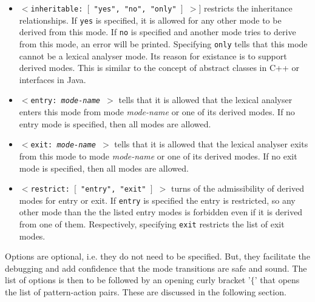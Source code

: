 \begin{itemize}
\item {\tt $<$inheritable: $[$ "yes", "no", "only" $]$ $>$$]$} restricts the
  inheritance relationships. If {\tt yes} is specified, it is allowed for any
  other mode to be derived from this mode. If {\tt no} is specified and
  another mode tries to derive from this mode, an error will be printed.
  Specifying {\tt only} tells that this mode cannot be a lexical analyser mode.
  Its reason for existance is to support derived modes. This is similar to the
  concept of abstract classes in C++ or interfaces in Java.
  
\item {\tt $<$entry: {\it mode-name} $>$} tells that it is allowed that the
  lexical analyser enters this mode from mode {\it mode-name} or one of its
  derived modes. If no entry mode is specified, then all modes are allowed.
  
\item {\tt $<$exit: {\it mode-name} $>$} tells that it is allowed that the
  lexical analyser exits from this mode to mode {\it mode-name} or one of its
  derived modes. If no exit mode is specified, then all modes are allowed.
  
\item {\tt $<$restrict: $[$ "entry", "exit" $]$ $>$} turns of the
  admissibility of derived modes for entry or exit.  If {\tt entry} is
  specified the entry is restricted, so any other mode than the the listed
  entry modes is forbidden even if it is derived from one of them.
  Respectively, specifying {\tt exit} restricts the list of exit modes.
\end{itemize}

Options are optional, i.e. they do not need to be specified. But, they
facilitate the debugging and add confidence that the mode transitions are 
safe and sound. The list of options is then to be followed by an opening
curly bracket '$\{$' that opens the list of pattern-action pairs. These are
discussed in the following section.




